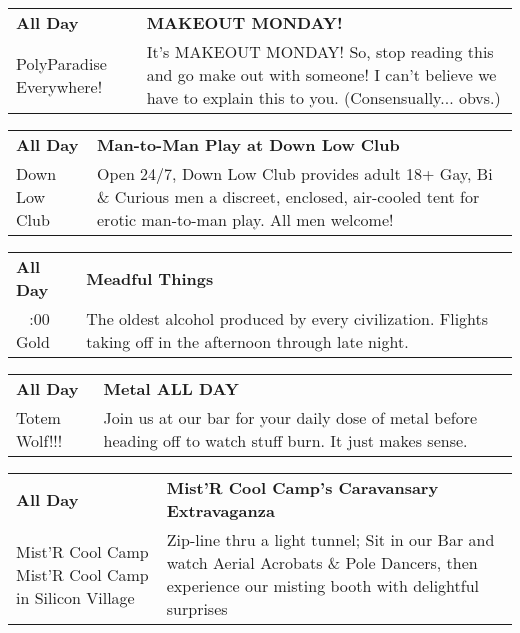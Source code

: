 \begin{tabular}{ p{1in} p{2.2in} }
    \textbf{All Day} & \textbf{MAKEOUT MONDAY!} \\
    PolyParadise \newline Everywhere! & It's MAKEOUT MONDAY! So, stop reading this and go make out with someone! I can't believe we have to explain this to you. (Consensually... obvs.) \\
    \hline 
\end{tabular}
    
\begin{tabular}{ p{1in} p{2.2in} }
    \textbf{All Day} & \textbf{Man-to-Man Play at Down Low Club} \\
    Down Low Club \newline  & Open 24/7, Down Low Club provides adult 18+ Gay, Bi \& Curious men a discreet, enclosed, air-cooled tent for erotic man-to-man play. All men welcome! \\
    \hline 
\end{tabular}
    
\begin{tabular}{ p{1in} p{2.2in} }
    \textbf{All Day} & \textbf{Meadful Things} \\
    ~ \newline 4:00 Gold & The oldest alcohol produced by every civilization.  Flights taking off in the afternoon through late night. \\
    \hline 
\end{tabular}
    
\begin{tabular}{ p{1in} p{2.2in} }
    \textbf{All Day} & \textbf{Metal ALL DAY } \\
    Totem Wolf!!! \newline  & Join us at our bar for your daily dose of metal before heading off to watch stuff burn. It just makes sense. \\
    \hline 
\end{tabular}
    
\begin{tabular}{ p{1in} p{2.2in} }
    \textbf{All Day} & \textbf{Mist'R Cool Camp's Caravansary Extravaganza} \\
    Mist'R Cool Camp \newline Mist'R Cool Camp in Silicon Village & Zip-line thru a light tunnel; Sit in our Bar and watch Aerial Acrobats \& Pole Dancers, then experience our misting booth with delightful surprises \\
    \hline 
\end{tabular}
    
